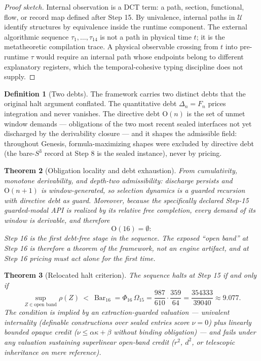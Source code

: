 \documentclass[11pt]{article}
\theoremstyle{plain}
\newtheorem{theorem}{Theorem}[section]
\theoremstyle{definition}
\newtheorem{definition}[theorem]{Definition}
\theoremstyle{remark}
\newenvironment{proofsketch}{\begin{proof}[Proof sketch]}{\end{proof}}
\newcommand{\U}{\mathcal{U}}
\newcommand{\SelBar}{\operatorname{Bar}}
\begin{document}
\begin{proofsketch}
Internal observation is a DCT term: a path, section, functional, flow, or record map defined after Step 15. By univalence, internal paths in \(\U\) identify structures by equivalence inside the runtime component. The external algorithmic sequence \(\tau_1,\ldots,\tau_{14}\) is not a path in physical time \(t\); it is the metatheoretic compilation trace. A physical observable crossing from \(t\) into pre-runtime \(\tau\) would require an internal path whose endpoints belong to different explanatory registers, which the temporal-cohesive typing discipline does not supply.
\end{proofsketch}

\begin{definition}[Two debts]
The framework carries two distinct debts that the original halt argument conflated. The quantitative debt \(\Delta_n=F_n\) prices integration and never vanishes. The directive debt \(\mathrm{O}(n)\) is the set of unmet window demands --- obligations of the two most recent sealed interfaces not yet discharged by the derivability closure --- and it shapes the admissible field: throughout Genesis, formula-maximizing shapes were excluded by directive debt (the bare-\(S^3\) record at Step 8 is the sealed instance), never by pricing.
\end{definition}

\begin{theorem}[Obligation locality and debt exhaustion]
From cumulativity, monotone derivability, and depth-two admissibility: discharge persists and \(\mathrm{O}(n+1)\) is window-generated, so selection dynamics is a guarded recursion with directive debt as guard. Moreover, because the specifically declared Step-15 guarded-modal API is realized by its relative free completion, every demand of its window is derivable, and therefore
\[
\mathrm{O}(16)=\emptyset:
\]
Step 16 is the first debt-free stage in the sequence. The exposed ``open band'' at Step 16 is therefore a theorem of the framework, not an engine artifact, and at Step 16 pricing must act alone for the first time.
\end{theorem}

\begin{theorem}[Relocated halt criterion]
The sequence halts at Step 15 if and only if
\[
\sup_{Z\in\text{open band}}\rho(Z)\ <\ \SelBar_{16}
=\Phi_{16}\,\Omega_{15}
=\frac{987}{610}\cdot\frac{359}{64}
=\frac{354333}{39040}\approx 9.077.
\]
The condition is implied by an extraction-guarded valuation --- univalent internality (definable constructions over sealed entries score \(\nu=0\)) plus linearly bounded opaque credit (\(\nu\le\alpha\kappa+\beta\) without binding obligation) --- and fails under any valuation sustaining superlinear open-band credit (\(r^2\), \(d^2\), or telescopic inheritance on mere reference).
\end{theorem}
\end{document}
